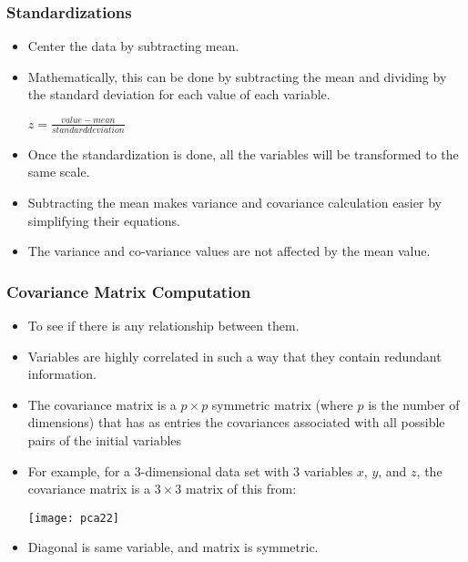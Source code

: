 \begin{frame}[fragile] \frametitle{Standardizations} 
\begin{itemize}
\item Center the data by subtracting mean.
\item Mathematically, this can be done by subtracting the mean and dividing by the standard deviation for each value of each variable.

$z = \frac{value - mean}{standard deviation}$
\item Once the standardization is done, all the variables will be transformed to the same scale.
\item Subtracting the mean makes variance and covariance 
calculation easier by simplifying their equations. 
\item The 
variance and co-variance values are not affected by 
the mean value.
\end{itemize}
\end{frame}

\begin{frame}[fragile] \frametitle{Covariance Matrix Computation} 
\begin{itemize}
\item To see if there is any relationship between them.
\item Variables are highly correlated in such a way that they contain redundant information.
\item The covariance matrix is a $p \times p$ symmetric matrix (where $p$ is the number of dimensions) that has as entries the covariances associated with all possible pairs of the initial variables
\item For example, for a 3-dimensional data set with 3 variables $x$, $y$, and $z$, the covariance matrix is a $3 \times 3$ matrix of this from:

\begin{center}
\texttt{[image: pca22]}
\end{center}
\item Diagonal is same variable, and matrix is symmetric.
\end{itemize}
\end{frame}

